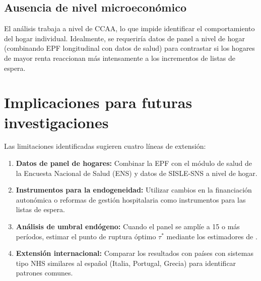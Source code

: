 \subsection{Ausencia de nivel microeconómico}

El análisis trabaja a nivel de CCAA, lo que impide identificar el comportamiento
del hogar individual. Idealmente, se requeriría datos de panel a nivel de hogar
(combinando EPF longitudinal con datos de salud) para contrastar si los hogares
de mayor renta reaccionan más intensamente a los incrementos de listas de espera.

\section{Implicaciones para futuras investigaciones}

Las limitaciones identificadas sugieren cuatro líneas de extensión:

\begin{enumerate}
  \item \textbf{Datos de panel de hogares:} Combinar la EPF con el módulo de salud
    de la Encuesta Nacional de Salud (ENS) y datos de SISLE-SNS a nivel de hogar.
  \item \textbf{Instrumentos para la endogeneidad:} Utilizar cambios en la
    financiación autonómica o reformas de gestión hospitalaria como instrumentos
    para las listas de espera.
  \item \textbf{Análisis de umbral endógeno:} Cuando el panel se amplíe a 15
    o más períodos, estimar el punto de ruptura óptimo $\tau^*$ mediante los
    estimadores de \textcite{Maddala1999}.
  \item \textbf{Extensión internacional:} Comparar los resultados con países
    con sistemas tipo NHS similares al español (Italia, Portugal, Grecia) para
    identificar patrones comunes.
\end{enumerate}
